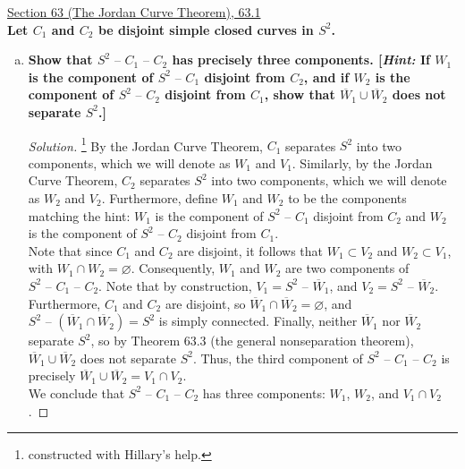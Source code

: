 \documentclass[11pt]{article}
\newenvironment{solution}
  {\renewcommand\qedsymbol{$\blacksquare$}\begin{proof}[Solution]}
  {\end{proof}}
\begin{document}
\newpage

\underline{Section 63 (The Jordan Curve Theorem), 63.1} \\

\textbf{Let $C_1$ and $C_2$ be disjoint simple closed curves in $S^2$.}

\begin{enumerate}[a)]
    \item \textbf{Show that $S^2 \text{ -- } C_1 \text{ -- } C_2$ has precisely three components. [\textit{Hint:} If $W_1$ is the component
    of $S^2 \text{ -- } C_1$ disjoint from $C_2$, and if $W_2$ is the component of $S^2 \text{ -- } C_2$ disjoint from $C_1$, show that
    $\overline{W}_1 \cup \overline{W}_2$ does not separate $S^2$.]}

    \begin{solution}\footnote{constructed with Hillary's help.}
    By the Jordan Curve Theorem, $C_1$ separates $S^2$ into two components, which we will denote as $W_1$ and $V_1$.
    Similarly, by the Jordan Curve Theorem, $C_2$ separates $S^2$ into two components, which we will denote as $W_2$ and $V_2$. Furthermore, define
    $W_1$ and $W_2$ to be the components matching the hint: $W_1$ is the component of $S^2 \text{ -- } C_1$ disjoint from $C_2$ and $W_2$ is the component of $S^2 \text{ -- } C_2$ disjoint from $C_1$. \\
    
    Note that since $C_1$ and $C_2$ are disjoint, it follows that $W_1 \subset V_2$ and $W_2 \subset V_1$, with $W_1 \cap W_2 = \varnothing$. Consequently, $W_1$ and $W_2$ are two components 
    of $S^2 \text{ -- } C_1 \text{ -- } C_2$. Note that by construction, $V_1 = S^2 \text{ -- } \overline{W}_1$, and $V_2 = S^2 \text{ -- } \overline{W}_2$. 
    Furthermore, $C_1$ and $C_2$ are disjoint, so $\overline{W}_1 \cap \overline{W}_2 = \varnothing$, and $S^2 \text{ -- } (\overline{W}_1 \cap \overline{W}_2) = S^2$ is simply connected. Finally, 
    neither $\overline{W}_1$ nor $\overline{W}_2$ separate $S^2$, so by Theorem 63.3 (the general nonseparation theorem), $\overline{W}_1 \cup \overline{W}_2$ does not separate $S^2$. Thus, the 
    third component of $S^2 \text { -- } C_1 \text{ -- } C_2$ is precisely $\overline{W}_1 \cup \overline{W}_2 = V_1 \cap V_2$. \\

    We conclude that $S^2 \text { -- } C_1 \text{ -- } C_2$ has three components: $W_1$, $W_2$, and $V_1 \cap V_2$. 
    \end{solution}
    

\end{enumerate}
\end{document}
